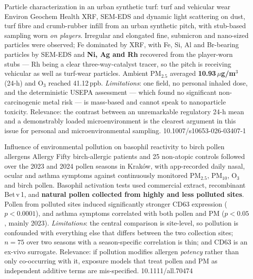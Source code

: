 \documentclass[10pt]{article}
\begin{document}
{Particle characterization in an urban synthetic turf: turf and vehicular wear}
{Environ Geochem Health}
{XRF, SEM-EDS and dynamic light scattering on dust, turf fibre and crumb-rubber infill
from an urban synthetic pitch, with stub-based sampling worn \emph{on players}. Irregular
and elongated fine, submicron and nano-sized particles were observed; Fe dominated by
XRF, with Fe, Si, Al and Br-bearing particles by SEM-EDS and \textbf{Ni, Ag and Rh}
recovered from the player-worn stubs --- Rh being a clear three-way-catalyst tracer, so
the pitch is receiving vehicular as well as turf-wear particles. Ambient PM$_{2.5}$
averaged \textbf{10.93\,$\mu$g/m$^3$} (24-h) and O$_3$ reached 41.12\,ppb.
\emph{Limitations}: one field, no personal inhaled dose, and the deterministic USEPA
assessment --- which found no significant non-carcinogenic metal risk --- is mass-based
and cannot speak to nanoparticle toxicity. Relevance: the contrast between an
unremarkable regulatory 24-h mean and a demonstrably loaded microenvironment is the
clearest argument in this issue for personal and microenvironmental sampling.}
{10.1007/s10653-026-03407-1}


{Influence of environmental pollution on basophil reactivity to birch pollen allergens}
{Allergy}
{Fifty birch-allergic patients and 25 non-atopic controls followed over the 2023 and 2024
pollen seasons in Krak\'ow, with app-recorded daily nasal, ocular and asthma symptoms
against continuously monitored PM$_{2.5}$, PM$_{10}$, O$_3$ and birch pollen. Basophil
activation tests used commercial extract, recombinant Bet\,v\,1, and \textbf{natural
pollen collected from highly and less polluted sites}. Pollen from polluted sites induced
significantly stronger CD63 expression ($p<0.0001$), and asthma symptoms correlated with
both pollen and PM ($p<0.05$, mainly 2023). \emph{Limitations}: the central comparison is
site-level, so pollution is confounded with everything else that differs between the two
collection sites; $n=75$ over two seasons with a season-specific correlation is thin; and
CD63 is an ex-vivo surrogate. Relevance: if pollution modifies allergen \emph{potency}
rather than only co-occurring with it, exposure models that treat pollen and PM as
independent additive terms are mis-specified.}
{10.1111/all.70474}
\end{document}
